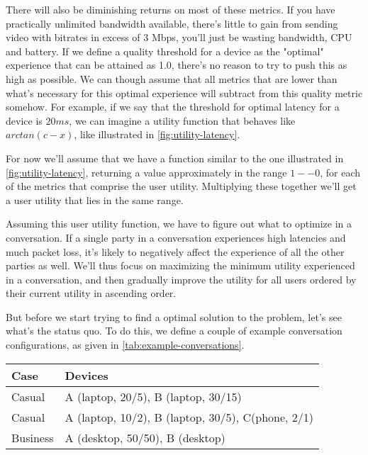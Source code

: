 There will also be diminishing returns on most of these metrics. If you have practically unlimited bandwidth available, there's little to gain from sending video with bitrates in excess of 3 Mbps, you'll just be wasting bandwidth, CPU and battery. If we define a quality threshold for a device as the "optimal" experience that can be attained as 1.0, there's no reason to try to push this as high as possible. We can though assume that all metrics that are lower than what's necessary for this optimal experience will subtract from this quality metric somehow. For example, if we say that the threshold for optimal latency for a device is \(20ms\), we can imagine a \gls{utility function} that behaves like \(arctan(c-x)\), like illustrated in \autoref{fig:utility-latency}.


For now we'll assume that we have a function similar to the one illustrated in \autoref{fig:utility-latency}, returning a value approximately in the range \(1 -- 0\), for each of the metrics that comprise the user utility. Multiplying these together we'll get a user utility that lies in the same range.

Assuming this user utility function, we have to figure out what to optimize in a conversation. If a single party in a conversation experiences high latencies and much packet loss, it's likely to negatively affect the experience of all the other parties as well. We'll thus focus on maximizing the minimum utility experienced in a conversation, and then gradually improve the utility for all users ordered by their current utility in ascending order.

But before we start trying to find a optimal solution to the problem, let's see what's the status quo. To do this, we define a couple of example conversation configurations, as given in \autoref{tab:example-conversations}.

\begin{center}
    \label{tab:example-conversations}
    \begin{tabular}{| l | l |}
    \hline
    \textbf{Case} & \textbf{Devices} \\ \hline
    Casual & A (laptop, 20/5), B (laptop, 30/15) \\ \hline
    Casual & A (laptop, 10/2), B (laptop, 30/5), C(phone, 2/1) \\ \hline
    Business & A (desktop, 50/50), B (desktop) \\ \hline
    \end{tabular}
\end{center}

